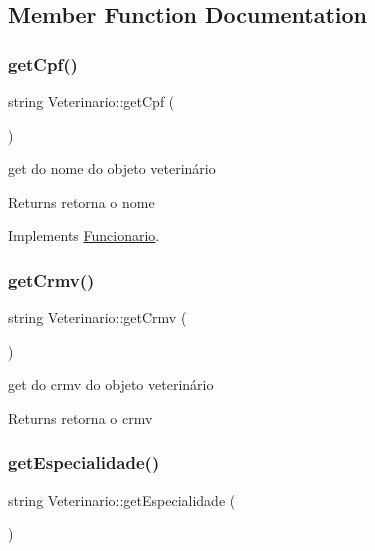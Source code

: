 \subsection{Member Function Documentation}
\mbox{\label{class_veterinario_af08ba2464f20c2ba51f3415f62777583}} 
\subsubsection{\texorpdfstring{getCpf()}{getCpf()}}
{\footnotesize\ttfamily string Veterinario\+::get\+Cpf (\begin{DoxyParamCaption}{ }\end{DoxyParamCaption})\hspace{0.3cm}{\ttfamily [virtual]}}



get do nome do objeto veterinário 

\begin{DoxyReturn}{Returns}
retorna o nome 
\end{DoxyReturn}


Implements \mbox{\hyperlink{class_funcionario}{Funcionario}}.

\mbox{\label{class_veterinario_ad2db954882b1bb854e5da0a5e09e77b5}} 
\subsubsection{\texorpdfstring{getCrmv()}{getCrmv()}}
{\footnotesize\ttfamily string Veterinario\+::get\+Crmv (\begin{DoxyParamCaption}{ }\end{DoxyParamCaption})}



get do crmv do objeto veterinário 

\begin{DoxyReturn}{Returns}
retorna o crmv 
\end{DoxyReturn}
\mbox{\label{class_veterinario_a5cc3a097b0235decb1409f67ba4973f8}} 
\subsubsection{\texorpdfstring{getEspecialidade()}{getEspecialidade()}}
{\footnotesize\ttfamily string Veterinario\+::get\+Especialidade (\begin{DoxyParamCaption}{ }\end{DoxyParamCaption})\hspace{0.3cm}{\ttfamily [virtual]}}



